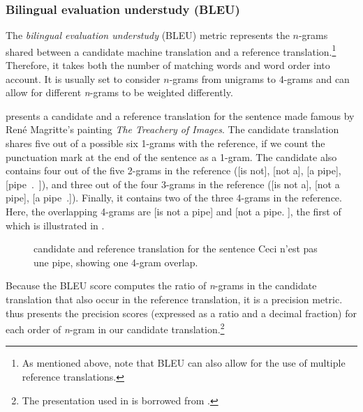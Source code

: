 \documentclass[output=paper]{langscibook}
\begin{document}
\subsubsection{\label{bkm:Ref57827797}Bilingual evaluation understudy (BLEU)}

The \textit{bilingual evaluation understudy} (BLEU) metric represents the $n$-grams shared between a candidate machine translation and a reference translation.\footnote{As mentioned above, note that BLEU can also allow for the use of multiple reference translations.} Therefore, it takes both the number of matching words and word order into account. It is usually set to consider $n$-grams from unigrams to 4-grams and can allow for different \textit{n}-grams to be weighted differently. 

 presents a candidate and a reference translation for the sentence made famous by René Magritte’s painting \textit{The Treachery of Images}. The candidate translation shares five out of a possible six 1-grams with the reference, if we count the punctuation mark at the end of the sentence as a 1-gram. The candidate also contains four out of the five 2-grams in the reference ([is not], [not a], [a pipe], [pipe~.~]), and three out of the four 3-grams in the reference ([is not a], [not a pipe], [a pipe~.]). Finally, it contains two of the three 4-grams in the reference. Here, the overlapping 4-grams are [is not a pipe] and [not a pipe. ], the first of which is illustrated in .

\begin{figure}
\caption{candidate and reference translation for the sentence \textup{Ceci n’est pas une pipe}, showing one 4-gram overlap.}
\label{fig:rossi:9}
\end{figure}

Because the BLEU score computes the ratio of \textit{n}-grams in the candidate translation that also occur in the reference translation, it is a precision metric.  thus presents the precision scores (expressed as a ratio and a decimal fraction) for each order of \textit{n}-gram in our candidate translation.\footnote{The presentation used in  is borrowed from \citep[227]{Koehn2010}.}
\end{document}
